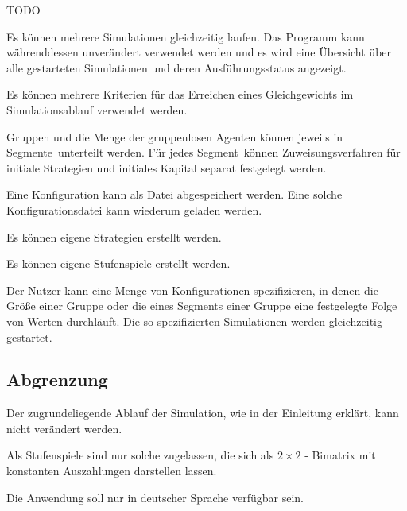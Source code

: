 \documentclass[parskip=full,11pt]{scrartcl}
\def\segment{Segment}
\def\segments{Segmente}
\begin{document}
TODO

Es können mehrere Simulationen gleichzeitig laufen. Das Programm kann währenddessen unverändert verwendet werden und es wird eine Übersicht über alle gestarteten Simulationen und deren Ausführungsstatus angezeigt.

Es können mehrere Kriterien für das Erreichen eines Gleichgewichts im Simulationsablauf verwendet werden.

Gruppen und die Menge der gruppenlosen Agenten können jeweils in \segments\ unterteilt werden. Für jedes \segment\ können Zuweisungsverfahren für initiale Strategien und initiales Kapital separat festgelegt werden.

Eine Konfiguration kann als Datei abgespeichert werden. Eine solche Konfigurationsdatei kann wiederum geladen werden.

Es können eigene Strategien erstellt werden.

Es können eigene Stufenspiele erstellt werden.

Der Nutzer kann eine Menge von Konfigurationen spezifizieren, in denen die Größe einer Gruppe oder die eines \segment s einer Gruppe eine festgelegte Folge von Werten durchläuft. Die so spezifizierten Simulationen werden gleichzeitig gestartet.

\subsection{Abgrenzung}

Der zugrundeliegende Ablauf der Simulation, wie in der Einleitung erklärt, kann nicht verändert werden.

Als Stufenspiele sind nur solche zugelassen, die sich als \(2 \times 2\) - Bimatrix mit konstanten Auszahlungen darstellen lassen.

Die Anwendung soll nur in deutscher Sprache verfügbar sein.
\end{document}
